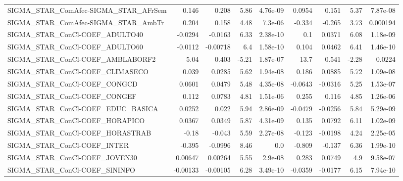\begin{tabular}{lrrrrrrrr}
SIGMA\_STAR\_ComAfec-SIGMA\_STAR\_AFrSem  &       0.146 &        0.208 &     5.86 & 4.76e-09 &     0.0954 &       0.151 &         5.37 &      7.87e-08 \\
SIGMA\_STAR\_ComAfec-SIGMA\_STAR\_AmbTr   &       0.204 &        0.158 &     4.48 &  7.3e-06 &     -0.334 &      -0.265 &         3.73 &      0.000194 \\
SIGMA\_STAR\_ConCl-COEF\_ADULTO40        &     -0.0294 &      -0.0163 &     6.33 & 2.38e-10 &        0.1 &      0.0371 &         6.08 &      1.18e-09 \\
SIGMA\_STAR\_ConCl-COEF\_ADULTO60        &     -0.0112 &     -0.00718 &      6.4 & 1.58e-10 &      0.104 &      0.0462 &         6.41 &      1.46e-10 \\
SIGMA\_STAR\_ConCl-COEF\_AMBLABORF2      &        5.04 &        0.403 &    -5.21 & 1.87e-07 &       13.7 &       0.541 &        -2.28 &        0.0224 \\
SIGMA\_STAR\_ConCl-COEF\_CLIMASECO       &       0.039 &       0.0285 &     5.62 & 1.94e-08 &      0.186 &      0.0885 &         5.72 &      1.09e-08 \\
SIGMA\_STAR\_ConCl-COEF\_CONGCD          &      0.0601 &       0.0479 &     5.48 & 4.35e-08 &    -0.0643 &     -0.0316 &         5.25 &      1.53e-07 \\
SIGMA\_STAR\_ConCl-COEF\_CONGEF          &       0.112 &       0.0783 &     4.81 & 1.51e-06 &      0.255 &       0.116 &         4.85 &      1.26e-06 \\
SIGMA\_STAR\_ConCl-COEF\_EDUC\_BASICA     &      0.0252 &        0.022 &     5.94 & 2.86e-09 &    -0.0479 &     -0.0256 &         5.84 &      5.29e-09 \\
SIGMA\_STAR\_ConCl-COEF\_HORAPICO        &      0.0367 &       0.0349 &     5.87 & 4.31e-09 &      0.135 &      0.0792 &         6.11 &      1.02e-09 \\
SIGMA\_STAR\_ConCl-COEF\_HORASTRAB       &       -0.18 &       -0.043 &     5.59 & 2.27e-08 &     -0.123 &     -0.0198 &         4.24 &      2.25e-05 \\
SIGMA\_STAR\_ConCl-COEF\_INTER           &      -0.395 &      -0.0996 &     8.46 &      0.0 &     -0.809 &      -0.137 &         6.36 &      1.99e-10 \\
SIGMA\_STAR\_ConCl-COEF\_JOVEN30         &     0.00647 &      0.00264 &     5.55 &  2.9e-08 &      0.283 &      0.0749 &          4.9 &      9.58e-07 \\
SIGMA\_STAR\_ConCl-COEF\_SININFO         &    -0.00133 &     -0.00105 &     6.28 & 3.49e-10 &    -0.0359 &     -0.0177 &         6.15 &      7.94e-10 \\

\end{tabular}
